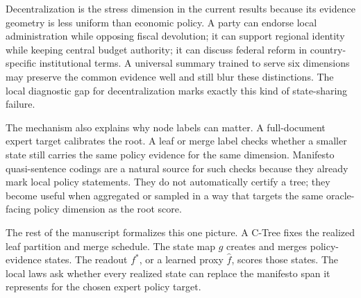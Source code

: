 Decentralization is the stress dimension in the current results because its
evidence geometry is less uniform than economic policy. A party can endorse
local administration while opposing fiscal devolution; it can support regional
identity while keeping central budget authority; it can discuss federal reform
in country-specific institutional terms. A universal summary trained to serve
six dimensions may preserve the common evidence well and still blur these
distinctions. The local diagnostic gap for decentralization marks exactly this
kind of state-sharing failure.

The mechanism also explains why node labels can matter. A full-document expert
target calibrates the root. A leaf or merge label checks whether a smaller
state still carries the same policy evidence for the same dimension. Manifesto
quasi-sentence codings are a natural source for such checks because they
already mark local policy statements. They do not automatically certify a tree;
they become useful when aggregated or sampled in a way that targets the same
oracle-facing policy dimension as the root score.

The rest of the manuscript formalizes this one picture. A C-Tree fixes the
realized leaf partition and merge schedule. The state map \(g\) creates and
merges policy-evidence states. The readout \(f^\ast\), or a learned proxy
\(\widehat f\), scores those states. The local laws ask whether every realized
state can replace the manifesto span it represents for the chosen expert
policy target.
